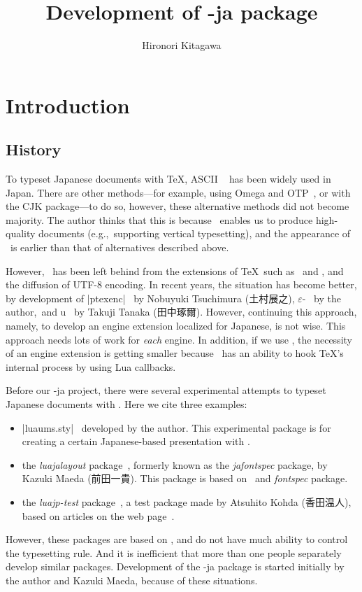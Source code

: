 \documentclass{ajt}
\title{Development of \LuaTeX-ja package}
\author[北川 弘典]{Hironori Kitagawa}
\begin{document}
\maketitle

\section{Introduction}
\subsection{History}
To typeset Japanese documents with \TeX, ASCII \pTeX~\cite{ptex} has
been widely used in Japan.  There are other methods---for example, using
Omega and OTP~\cite{omega}, or with the CJK package---to do so, however,
these alternative methods did not become majority.  The author thinks
that this is because \pTeX\ enables us to produce high-quality documents
(e.g.,~supporting vertical typesetting), and the appearance of \pTeX\ is
earlier than that of alternatives described above.

However, \pTeX\ has been left behind from the extensions of \TeX\ such
as \eTeX\ and \pdfTeX, and the diffusion of UTF-8 encoding.  In recent
years, the situation has become better, by development of
|ptexenc|~\cite{ptexenc} by Nobuyuki Tsuchimura (\hbox{土村展之}),
$\varepsilon$-\pTeX~\cite{eptex} by the author,~and u\pTeX~\cite{uptex}
by Takuji Tanaka (田中琢爾). However, continuing this approach, namely,
to develop an engine extension localized for Japanese, is not wise. This
approach needs lots of work for \emph{each} engine. In addition, if we
use \LuaTeX, the necessity of an engine extension is getting smaller
because \LuaTeX\ has an ability to hook \TeX's internal process by using
Lua callbacks.

Before our \LuaTeX-ja project, there were several experimental attempts to typeset
Japanese documents with \LuaTeX. Here we cite three examples:
\begin{itemize}
\item |luaums.sty|~\cite{luaums} developed by the author. This
      experimental package is for creating a certain Japanese-based presentation
      with \LuaTeX.
\item the \emph{luajalayout} package~\cite{luajalayout}, formerly known as the
      \emph{jafontspec} package, by Kazuki Maeda (前田一貴). This package is based on
      \LaTeXe\ and \emph{fontspec} package.
\item the \emph{luajp-test} package~\cite{luajp-test}, a test package made by
      Atsuhito Kohda (香田温人), based on articles on the web page~\cite{joylua}.
\end{itemize}
However, these packages are based on \LaTeXe, and do not have much
ability to control the typesetting rule. And it is inefficient that more
than one people separately develop similar packages.  Development of the
\LuaTeX-ja package is started initially by the author and Kazuki Maeda, because of
these situations.
\end{document}
